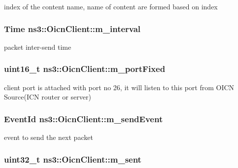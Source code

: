 index of the content name, name of content are formed based on index 

\hypertarget{classns3_1_1OicnClient_a4b3472531c624271e4fa7a2deb1d524c}{
\subsubsection[{m\-\_\-interval}]{\setlength{\rightskip}{0pt plus 5cm}Time ns3\-::\-Oicn\-Client\-::m\-\_\-interval\hspace{0.3cm}{\ttfamily [private]}}}\label{classns3_1_1OicnClient_a4b3472531c624271e4fa7a2deb1d524c}


packet inter-\/send time 

\hypertarget{classns3_1_1OicnClient_a96e719be70f2eb12ff391caf0a41367d}{
\subsubsection[{m\-\_\-port\-Fixed}]{\setlength{\rightskip}{0pt plus 5cm}uint16\-\_\-t ns3\-::\-Oicn\-Client\-::m\-\_\-port\-Fixed\hspace{0.3cm}{\ttfamily [private]}}}\label{classns3_1_1OicnClient_a96e719be70f2eb12ff391caf0a41367d}


client port is attached with port no 26, it will listen to this port from O\-I\-C\-N Source(\-I\-C\-N router or server) 

\hypertarget{classns3_1_1OicnClient_ad4f77ec10de5d2aad0c3b42f56c22c8c}{
\subsubsection[{m\-\_\-send\-Event}]{\setlength{\rightskip}{0pt plus 5cm}Event\-Id ns3\-::\-Oicn\-Client\-::m\-\_\-send\-Event\hspace{0.3cm}{\ttfamily [private]}}}\label{classns3_1_1OicnClient_ad4f77ec10de5d2aad0c3b42f56c22c8c}


event to send the next packet 

\hypertarget{classns3_1_1OicnClient_a5a15019661aa3b479f872b42c601cf36}{
\subsubsection[{m\-\_\-sent}]{\setlength{\rightskip}{0pt plus 5cm}uint32\-\_\-t ns3\-::\-Oicn\-Client\-::m\-\_\-sent\hspace{0.3cm}{\ttfamily [private]}}}\label{classns3_1_1OicnClient_a5a15019661aa3b479f872b42c601cf36}


